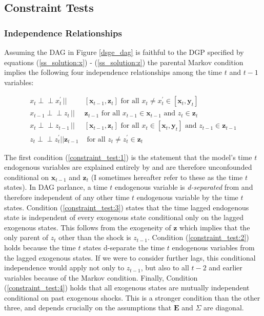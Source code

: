 \documentclass{article}
\def\indep{\perp \!\!\! \perp}
\begin{document}
\subsection{Constraint Tests} \label{constrainttests}

\subsubsection{Independence Relationships}

Assuming the DAG in Figure \ref{dsge_dag} is faithful to the DGP specified by equations (\ref{ss_solution:x}) - (\ref{ss_solution:z}) the parental Markov condition implies the following four independence relationships among the time $t$ and $t-1$ variables:

\begin{align}
  x_t \indep x^{\prime}_{t} \,||\,& [\mathbf{x}_{t-1},\mathbf{z}_t] \text{ for all } x_t \neq x^{\prime}_{t} \in [\mathbf{x}_t, \mathbf{y}_t] \label{constraint_test:1} \\
  x_{t-1} \indep z_{t} \,||\,& \mathbf{z}_{t-1} \text{ for all } x_{t-1} \in \mathbf{x}_{t-1} \text{ and } z_{t} \in \mathbf{z}_t \label{constraint_test:3} \\
  x_t \indep z_{t-1} \,||\,& [\mathbf{x}_{t-1}, \mathbf{z}_t] \text{ for all } x_t \in [\mathbf{x}_t, \mathbf{y}_t] \text{ and } z_{t-1} \in \mathbf{z}_{t-1} \label{constraint_test:2} \\
  z_t \indep z^{\prime}_{t} || \mathbf{z}_{t-1} & \text{ for all } z_t \not = z^{\prime}_{t} \in \mathbf{z}_t \label{constraint_test:4}
\end{align}

The first condition (\ref{constraint_test:1}) is the statement that the model's time $t$ endogenous variables are explained entirely by and are therefore unconfounded conditional on $\mathbf{x}_{t-1}$ and $\mathbf{z}_t$ (I sometimes hereafter refer to these as the time $t$ states). In DAG parlance, a time $t$ endogenous variable is \textit{d-separated} from and therefore independent of any other time $t$ endogenous variable by the time $t$ states. Condition (\ref{constraint_test:3}) states that the time lagged endogenous state is independent of every exogenous state conditional only on the lagged exogenous states. This follows from the exogeneity of $\mathbf{z}$ which implies that the only parent of $z_t$ other than the shock is $z_{t-1}$. Condition (\ref{constraint_test:2}) holds because the time $t$ states d-separate the time $t$ endogenous variables from the lagged exogenous states. If we were to consider further lags, this conditional independence would apply not only to $z_{t-1}$, but also to all $t-2$ and earlier variables because of the Markov condition. Finally, Condition (\ref{constraint_test:4}) holds that all exogenous states are mutually independent conditional on past exogenous shocks. This is a stronger condition than the other three, and depends crucially on the assumptions that $\mathbf{E}$ and $\Sigma$ are diagonal.
\end{document}
